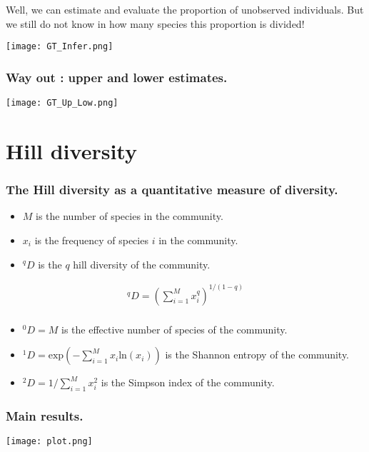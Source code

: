 \documentclass[10pt]{beamer}
\begin{document}
\begin{frame}
\begin{center}
Well, we can estimate and evaluate the proportion of unobserved individuals.
But we still do not know in how many species this proportion is divided!
\end{center}
\begin{center}
       \texttt{[image: GT\_Infer.png]}
	\end{center}
\end{frame}

\begin{frame}
\frametitle{Way out : upper and lower estimates.}

	\begin{center}
       \texttt{[image: GT\_Up\_Low.png]}
	\end{center}
\end{frame}


\section{Hill diversity}

\begin{frame}
\frametitle{The Hill diversity as a quantitative measure of diversity.}
	\begin{itemize}
		\item<1> $M$ is the number of species in the community.
		\item<1> $x_i$ is the frequency of species $i$ in the community.
		\item<1> $^q D$ is the $q$ hill diversity  of the community.
	\end{itemize}
	\begin{align*}
		^q D = \left( \sum_{i=1}^{M} x_i^q \right)^{1/(1-q)} \\
	\end{align*}
	\begin{itemize}
		\item<1> $^0 D = M$ is the effective number of species of the community.
		\item<1> $^1 D = \mathrm{exp} \left( - \sum_{i=1}^{M} x_i \mathrm{ln} ( x_i )  \right) $ is the Shannon entropy of the community.
		\item<1> $^2 D = 1 / \sum_{i=1}^{M} x_i^2 $ is the Simpson index of the community.
	\end{itemize}
\end{frame}

\begin{frame}
\frametitle{Main results.}
\begin{center}
	\texttt{[image: plot.png]}
\end{center}
\end{frame}
\end{document}
